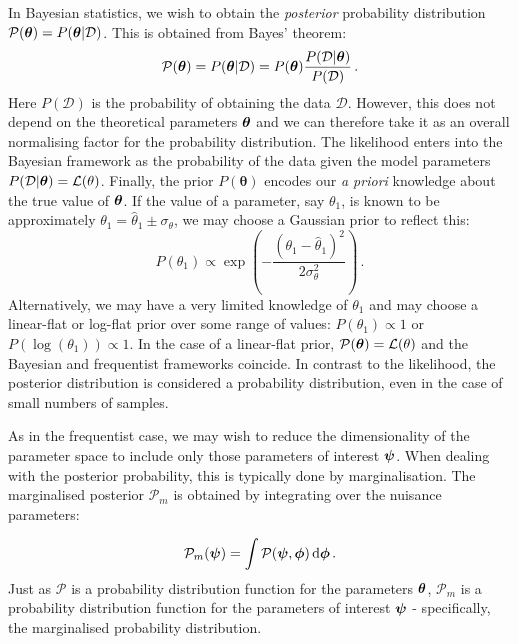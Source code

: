 In Bayesian statistics, we wish to obtain the \textit{posterior} probability distribution $\mathcal{P}(\boldsymbol\theta) = P(\boldsymbol\theta|\mathcal{D})$. This is obtained from Bayes' theorem:
\begin{equation}
\mathcal{P}(\boldsymbol\theta) = P(\boldsymbol\theta|\mathcal{D}) = P(\boldsymbol\theta) \frac{P(\mathcal{D}|\boldsymbol\theta)}{P(\mathcal{D})}\,.
\end{equation}
Here $P(\mathcal{D})$ is the probability of obtaining the data $\mathcal{D}$. However, this does not depend on the theoretical parameters $\boldsymbol\theta$ and we can therefore take it as an overall normalising factor for the probability distribution. The likelihood enters into the Bayesian framework as the probability of the data given the model parameters $P(\mathcal{D}|\boldsymbol\theta) = \mathcal{L}(\bold\theta)$. Finally, the prior $P(\boldsymbol\theta)$ encodes our \textit{a priori} knowledge about the true value of $\boldsymbol\theta$. If the value of a parameter, say $\theta_1$, is known to be approximately $\theta_1 = \hat{\theta}_1 \pm \sigma_\theta$, we may choose a Gaussian prior to reflect this:
\begin{equation}
P(\theta_1) \propto \exp\left(-\frac{(\theta_1 - \hat{\theta}_1)^2}{2\sigma_\theta^2}\right)\,.
\end{equation}
Alternatively, we may have a very limited knowledge of $\theta_1$ and may choose a linear-flat or log-flat prior over some range of values: $P(\theta_1) \propto 1$ or $P(\log(\theta_1)) \propto 1$. In the case of a linear-flat prior, $\mathcal{P}(\boldsymbol\theta) = \mathcal{L}(\theta)$ and the Bayesian and frequentist frameworks coincide. In contrast to the likelihood, the posterior distribution is considered a probability distribution, even in the case of small numbers of samples.

As in the frequentist case, we may wish to reduce the dimensionality of the parameter space to include only those parameters of interest $\boldsymbol\psi$. When dealing with the posterior probability, this is typically done by marginalisation. The marginalised posterior $\mathcal{P}_m$ is obtained by integrating over the nuisance parameters:

\begin{equation}
\mathcal{P}_m(\boldsymbol\psi) = \int \mathcal{P}(\boldsymbol\psi, \boldsymbol\phi) \, \textrm{d}\boldsymbol\phi\,.
\end{equation}
Just as $\mathcal{P}$ is a probability distribution function for the parameters $\boldsymbol\theta$, $\mathcal{P}_m$ is a probability distribution function for the parameters of interest $\boldsymbol\psi$ - specifically, the marginalised probability distribution.

